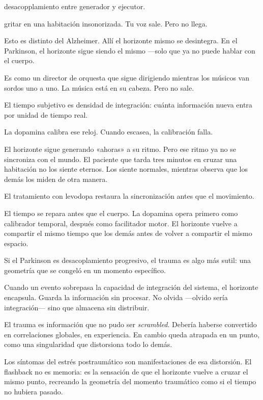 \begin{fisica}
 desacopplamiento entre generador y ejecutor.

 gritar en una habitación insonorizada. Tu voz sale. Pero no llega.
\end{fisica}
Esto es distinto del Alzheimer. Allí el horizonte mismo se desintegra. En el Parkinson, el horizonte sigue siendo el mismo —solo que ya no puede hablar con el cuerpo.

Es como un director de orquesta que sigue dirigiendo mientras los músicos van sordos uno a uno. La música está en su cabeza. Pero no sale.

\noindent El tiempo subjetivo es densidad de integración: cuánta información nueva entra por unidad de tiempo real.

La dopamina calibra ese reloj. Cuando escasea, la calibración falla.

El horizonte sigue generando «ahoras» a su ritmo. Pero ese ritmo ya no se sincroniza con el mundo. El paciente que tarda tres minutos en cruzar una habitación no los siente eternos. Los siente normales, mientras observa que los demás los miden de otra manera.

El tratamiento con levodopa restaura la sincronización antes que el movimiento.

El tiempo se repara antes que el cuerpo. La dopamina opera primero como calibrador temporal, después como facilitador motor. El horizonte vuelve a compartir el mismo tiempo que los demás antes de volver a compartir el mismo espacio.

\noindent Si el Parkinson es desacoplamiento progresivo, el trauma es algo más sutil: una geometría que se congeló en un momento específico.

Cuando un evento sobrepasa la capacidad de integración del sistema, el horizonte encapsula. Guarda la información sin procesar. No olvida —olvido sería integración— sino que almacena sin distribuir.

El trauma es información que no pudo ser \emph{scrambled}. Debería haberse convertido en correlaciones globales, en experiencia. En cambio queda atrapada en un punto, como una singularidad que distorsiona todo lo demás.

Los síntomas del estrés postraumático son manifestaciones de esa distorsión. El flashback no es memoria: es la sensación de que el horizonte vuelve a cruzar el mismo punto, recreando la geometría del momento traumático como si el tiempo no hubiera pasado.

